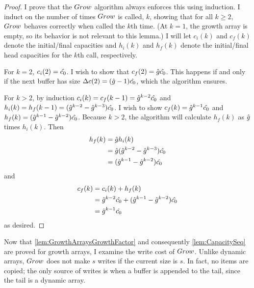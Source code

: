 \begin{proof}
	I prove that the $Grow$ algorithm always enforces this using induction. I induct on the number of times $Grow$ is called, $k$, showing that for all $k \geq 2$, $Grow$ behaves correctly when called the $k$th time. (At $k = 1$, the growth array is empty, so its behavior is not relevant to this lemma.) I will let $c_i(k)$ and $c_f(k)$ denote the initial/final capacities and $h_i(k)$ and $h_f(k)$ denote the initial/final head capacities for the $k$th call, respectively.

	For $k = 2$, $c_i(2) = \hat{c_0}$. I wish to show that $c_f(2) = \hat{g}\hat{c_0}$. This happens if and only if the next buffer has size ${\Delta c}(2) = (\hat{g} - 1)\hat{c_0}$, which the algorithm ensures.
	
	For $k > 2$, by induction $c_i(k) = c_f(k - 1) = \hat{g}^{k - 2}\hat{c_0}$ and $h_i(k) = h_f(k - 1) = (\hat{g}^{k - 2} - \hat{g}^{k - 3})\hat{c_0}$. I wish to show $c_f(k) = \hat{g}^{k - 1}\hat{c_0}$ and $h_f(k) = (\hat{g}^{k - 1} - \hat{g}^{k - 2})\hat{c_0}$. Because $k > 2$, the algorithm will calculate $h_f(k)$ as $\hat{g}$ times $h_i(k)$. Then
	\begin{align*}
	h_f(k) &= \hat{g} h_i(k)\\
	&= \hat{g} (\hat{g}^{k - 2} - \hat{g}^{k - 3})\hat{c_0}\\
	&= (\hat{g}^{k - 1} - \hat{g}^{k - 2})\hat{c_0}
	\end{align*}
	and
	\begin{align*}
	c_f(k) &= c_i(k) + h_f(k)\\
	&= \hat{g}^{k - 2}\hat{c_0} + (\hat{g}^{k - 1} - \hat{g}^{k - 2})\hat{c_0}\\
	&= \hat{g}^{k - 1}\hat{c_0}
	\end{align*}
	as desired.
\end{proof}

Now that \ref{lem:GrowthArraysGrowthFactor} and consequently \ref{lem:CapacitySeq} are proved for growth arrays, I examine the write cost of $Grow$. Unlike dynamic arrays, $Grow$ does not make $s$ writes if the current size is $s$. In fact, no items are copied; the only source of writes is when a buffer is appended to the tail, since the tail is a dynamic array.


